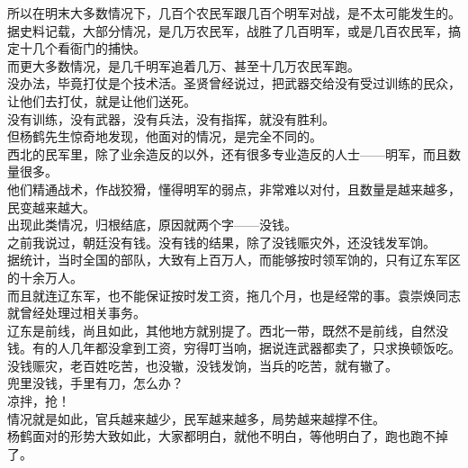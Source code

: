 \begin{multicols}{\theparacolNo}
所以在明末大多数情况下，几百个农民军跟几百个明军对战，是不太可能发生的。据史料记载，大部分情况，是几万农民军，战胜了几百明军，或是几百农民军，搞定十几个看衙门的捕快。\\

而更大多数情况，是几千明军追着几万、甚至十几万农民军跑。\\

没办法，毕竟打仗是个技术活。圣贤曾经说过，把武器交给没有受过训练的民众，让他们去打仗，就是让他们送死。\\

没有训练，没有武器，没有兵法，没有指挥，就没有胜利。\\

但杨鹤先生惊奇地发现，他面对的情况，是完全不同的。\\

西北的民军里，除了业余造反的以外，还有很多专业造反的人士——明军，而且数量很多。\\

他们精通战术，作战狡猾，懂得明军的弱点，非常难以对付，且数量是越来越多，民变越来越大。\\

出现此类情况，归根结底，原因就两个字——没钱。\\

之前我说过，朝廷没有钱。没有钱的结果，除了没钱赈灾外，还没钱发军饷。\\

据统计，当时全国的部队，大致有上百万人，而能够按时领军饷的，只有辽东军区的十余万人。\\

而且就连辽东军，也不能保证按时发工资，拖几个月，也是经常的事。袁崇焕同志就曾经处理过相关事务。\\

辽东是前线，尚且如此，其他地方就别提了。西北一带，既然不是前线，自然没钱。有的人几年都没拿到工资，穷得叮当响，据说连武器都卖了，只求换顿饭吃。\\

没钱赈灾，老百姓吃苦，也没辙，没钱发饷，当兵的吃苦，就有辙了。\\

兜里没钱，手里有刀，怎么办？\\

凉拌，抢！\\

情况就是如此，官兵越来越少，民军越来越多，局势越来越撑不住。\\

杨鹤面对的形势大致如此，大家都明白，就他不明白，等他明白了，跑也跑不掉了。\\


\end{multicols}
